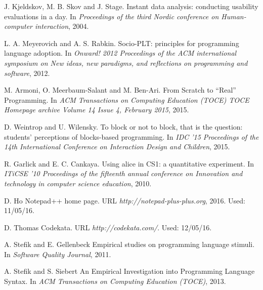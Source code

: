 \documentclass[preprint,10pt]{sigplanconf}
\begin{document}
\begin{thebibliography}{}
J. Kjeldskov, M. B. Skov and J. Stage. \newblock Instant data analysis: conducting usability evaluations in a day. \newblock In \emph{Proceedings of the third Nordic conference on Human-computer interaction}, 2004.

L. A. Meyerovich and A. S. Rabkin. \newblock Socio-PLT: principles for programming language adoption. \newblock In \emph{Onward! 2012 Proceedings of the ACM international symposium on New ideas, new paradigms, and reflections on programming and software}, 2012.

M. Armoni, O. Meerbaum-Salant and M. Ben-Ari. \newblock From Scratch to “Real” Programming. \newblock In \emph{ACM Transactions on Computing Education (TOCE) TOCE Homepage archive Volume 14 Issue 4, February 2015}, 2015.

D. Weintrop and U. Wilensky. \newblock To block or not to block, that is the question: students' perceptions of blocks-based programming. \newblock In \emph{IDC '15 Proceedings of the 14th International Conference on Interaction Design and Children}, 2015.

R. Garlick and E. C. Cankaya. \newblock Using alice in CS1: a quantitative experiment. \newblock In \emph{ITiCSE '10 Proceedings of the fifteenth annual conference on Innovation and technology in computer science education}, 2010.

D. Ho \newblock Notepad++ home page. \newblock URL \emph{http://notepad-plus-plus.org}, 2016. \newblock Used: 11/05/16.

D. Thomas \newblock Codekata. \newblock URL \emph{http://codekata.com/}. \newblock Used: 12/05/16.

A. Stefik and E. Gellenbeck \newblock Empirical studies on programming language stimuli. \newblock In \emph{Software Quality Journal}, 2011.

A. Stefik and S. Siebert \newblock An Empirical Investigation into Programming Language Syntax. \newblock In \emph{ACM Transactions on Computing Education (TOCE)}, 2013.


\end{thebibliography}
\end{document}
